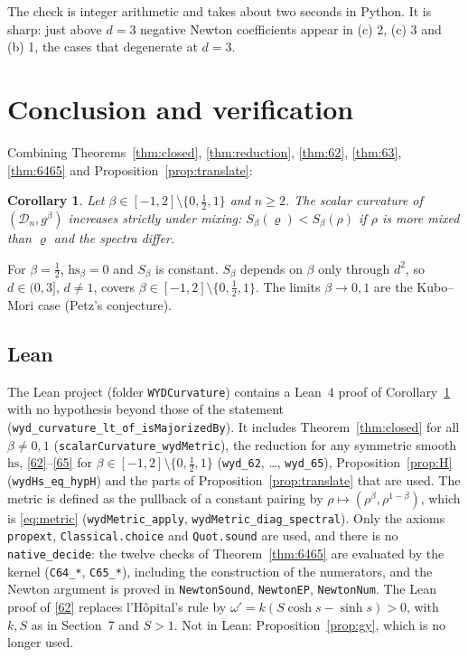 \documentclass[11pt]{amsart}
\newtheorem{corollary}[theorem]{Corollary}
\theoremstyle{definition}
\numberwithin{equation}{section}
\newcommand{\Dn}{\mathcal{D}_n}
\newcommand{\hs}{\mathrm{hs}}
\begin{document}
The check is integer arithmetic and takes about two seconds in Python. It is sharp: just above $d=3$ negative Newton coefficients appear in (c) 2, (c) 3 and (b) 1, the cases that degenerate at $d=3$.

\section{Conclusion and verification}\label{sec:status}

Combining Theorems~\ref{thm:closed}, \ref{thm:reduction}, \ref{thm:62}, \ref{thm:63}, \ref{thm:6465} and Proposition~\ref{prop:translate}:

\begin{corollary}\label{cor:main}
Let $\beta\in[-1,2]\setminus\{0,\frac12,1\}$ and $n\ge2$. The scalar curvature of $(\Dn,g^\beta)$ increases strictly under mixing: $S_\beta(\varrho)<S_\beta(\rho)$ if $\rho$ is more mixed than $\varrho$ and the spectra differ.
\end{corollary}

For $\beta=\frac12$, $\hs_\beta=0$ and $S_\beta$ is constant. $S_\beta$ depends on $\beta$ only through $d^2$, so $d\in(0,3]$, $d\ne1$, covers $\beta\in[-1,2]\setminus\{0,\frac12,1\}$. The limits $\beta\to0,1$ are the Kubo--Mori case (Petz's conjecture).

\subsection*{Lean} The Lean project (folder \texttt{WYDCurvature}) contains a Lean~4 proof of Corollary~\ref{cor:main} with no hypothesis beyond those of the statement (\texttt{wyd\_curvature\_lt\_of\_isMajorizedBy}). It includes
Theorem~\ref{thm:closed} for all $\beta\ne0,1$ (\texttt{scalarCurvature\_wydMetric}), the reduction for any symmetric smooth $\hs$, \eqref{62}--\eqref{65} for $\beta\in[-1,2]\setminus\{0,\frac12,1\}$
(\texttt{wyd\_62}, \dots, \texttt{wyd\_65}), Proposition~\ref{prop:H} (\texttt{wydHs\_eq\_hypH}) and the parts of Proposition~\ref{prop:translate} that are used. The metric is defined as the pullback of a constant pairing by
$\rho\mapsto(\rho^\beta,\rho^{1-\beta})$, which is \eqref{eq:metric} (\texttt{wydMetric\_apply}, \texttt{wydMetric\_diag\_spectral}). Only the axioms \texttt{propext},
\texttt{Classical.choice} and \texttt{Quot.sound} are used, and there is no \texttt{native\_decide}: the twelve checks of Theorem~\ref{thm:6465} are evaluated by the kernel (\texttt{C64\_*}, \texttt{C65\_*}), including the construction of the numerators, and the
Newton argument is proved in \texttt{NewtonSound}, \texttt{NewtonEP}, \texttt{NewtonNum}. The Lean proof of \eqref{62} replaces l'H\^opital's rule by $\omega'=k(S\cosh s-\sinh s)>0$, with $k,S$ as in Section~7 and $S>1$. Not in Lean: Proposition~\ref{prop:gy}, which is no longer used.
\end{document}
